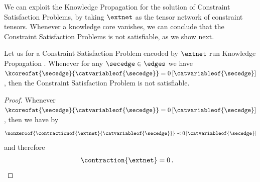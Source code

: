 We can exploit the Knowledge Propagation  for the solution of Constraint Satisfaction Problems, by taking $\extnet$ as the tensor network of constraint tensors.
Whenever a knowledge core vanishes, we can conclude that the Constraint Satisfaction Problems is not satisfiable, as we show next.

\begin{corollary}
    Let us for a Constraint Satisfaction Problem encoded by $\extnet$ run Knowledge Propagation .
    Whenever for any $\secedge\in\edges$ we have $\kcoreofat{\secedge}{\catvariableof{\secedge}}=\zerosat{\catvariableof{\secedge}}$, then the Constraint Satisfaction Problem is not satisfiable.
\end{corollary}
\begin{proof}
    Whenever $\kcoreofat{\secedge}{\catvariableof{\secedge}}=\zerosat{\catvariableof{\secedge}}$, then we have by 
    \begin{align*}
        \nonzeroof{\contractionof{\extnet}{\catvariableof{\secedge}}} \prec \zerosat{\catvariableof{\secedge}}
    \end{align*}
    and therefore
    \begin{align*}
        \contraction{\extnet} = 0 \, . & \qedhere
    \end{align*}
\end{proof}

